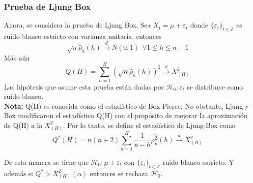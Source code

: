 \documentclass{article}
\theoremstyle{remark}
\begin{document}
\subsubsection{Prueba de Ljung Box}
Ahora, se considera la prueba de Ljung Box. Sea $X_{t}=\mu+\varepsilon_{t}$ donde $\{ \varepsilon_{t}\}_{t\in \mathbb{Z}}$ es ruido blanco estricto con varianza unitaria, entonces
\begin{equation*}
    \sqrt{n}\hat{\rho}_{n}(h) \xrightarrow{d} N(0,1) \ \ \forall  1\leq h \leq n-1
\end{equation*}
Más aún
\begin{equation*}
    Q(H)=\sum_{h=1}^{H}(\sqrt{n}\hat{\rho}_{n}(h))^{2}\xrightarrow{d} X^{2}_{(H)}
\end{equation*}
Las hipótesis que asume esta prueba están dadas por $\mathscr{H}_{0}: \varepsilon_{t}$ se distribuye como ruido blanco.\\

\textbf{Nota:} Q(H) es conocida como el estadístico de Box-Pierce. No obstante, Ljung y Box modificaron el estadístico Q(H) con el propósito de mejorar la aproximación de Q(H) a la $X^{2}_{(H)}$. Por lo tanto, se define el estadístico de Ljung-Box como 
\begin{equation*}
    Q^{*}(H)=n(n+2)\sum_{h=1}^{H}\frac{1}{n-h}\hat{\rho_{n}^{2}}(h) \xrightarrow{d} X^{2}_{(H)}
\end{equation*}

De esta manera se tiene que $\mathscr{H}_0: \mu + \varepsilon_{t}$ con $\{ \varepsilon_{t}\}_{t\in \mathbb{Z}}$ ruido blanco estricto. Y además si $Q^{*}>X^{2}_{(H)}(\alpha)$ entonces se rechaza $\mathscr{H}_0$. \\ 
\end{document}
